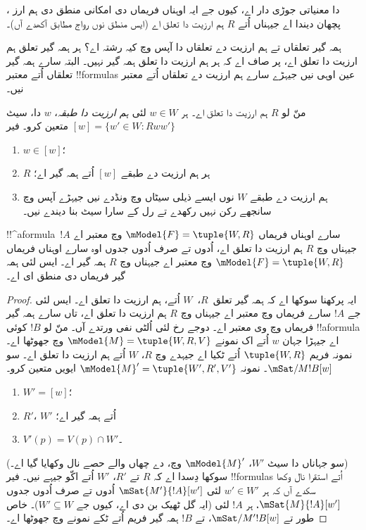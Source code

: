 \documentclass[../../../include/open-logic-section]{subfiles}
\begin{document}
،  دا معنیاتی جوڑی دار اے، کیوں جے ایہ اوہناں فریماں دی امکانی منطق دی ہم ارز پچھان دیندا اے جیہناں اُتے $R$ ہم ارزیت دا تعلق اے (ایس منطق نوں رواج مطابق  آکھدے آں)۔

ہمہ گیر تعلقاں تے ہم ارزیت دے تعلقاں دا آپس وچ کیہ رشتہ اے؟ ہر ہمہ گیر تعلق ہم ارزیت دا تعلق اے، پر صاف اے کہ ہر ہم ارزیت دا تعلق ہمہ گیر نہیں۔ البتہ سارے ہمہ گیر تعلقاں اُتے معتبر !!{formula}s عین اوہی نیں جیہڑے سارے ہم ارزیت دے تعلقاں اُتے معتبر نیں۔

\begin{prop}
  منّ لو $R$ ہم ارزیت دا تعلق اے۔ ہر $w \in W$ لئی \emph{ہم ارزیت دا طبقہ}، $w$ دا، سیٹ $[w] = \{w'\in W :
  Rww'\}$ متعین کرو۔ فیر
  \begin{enumerate}
  \item $w \in [w]$؛
  \item $R$ ہر ہم ارزیت دے طبقے $[w]$ اُتے ہمہ گیر اے؛
  \item ہم ارزیت دے طبقے $W$ نوں ایسے ذیلی سیٹاں وچ ونڈدے نیں جیہڑے آپس وچ سانجھے رکن نہیں رکھدے تے رل کے سارا سیٹ بنا دیندے نیں۔
  \end{enumerate}
\end{prop}

\begin{prop}
  !!^a{formula}~$!A$ سارے اوہناں فریماں $\mModel{F} =\tuple{W,R}$ وچ معتبر اے جیہناں وچ $R$ ہم ارزیت دا تعلق اے، اُدوں تے صرف اُدوں جدوں اوہ سارے اوہناں فریماں $\mModel{F} =\tuple{W,R}$ وچ معتبر اے جیہناں وچ $R$ ہمہ گیر اے۔ ایس لئی ہمہ گیر فریماں دی منطق  ای اے۔
\end{prop}

\begin{proof}
  ایہ پرکھنا سوکھا اے کہ ہمہ گیر تعلق~$R$،~$W$ اُتے، ہم ارزیت دا تعلق اے۔ ایس لئی جے $!A$ سارے فریماں وچ معتبر اے جیہناں وچ $R$ ہم ارزیت دا تعلق اے، تاں سارے ہمہ گیر فریماں وچ وی معتبر اے۔ دوجے رخ لئی اُلٹی نفی ورتدے آں۔ منّ لو $!B$ کوئی !!a{formula} اے جیہڑا جہان $w$ اُتے اک نمونے $\mModel{M} = \tuple{W, R, V}$ وچ جھوٹھا اے۔ نمونہ فریم $\tuple{W,R}$ اُتے ٹکیا اے جیہدے وچ $R$، $W$ اُتے ہم ارزیت دا تعلق اے۔ سو $\mSat/{M}{!B}[w]$۔ نمونہ $\mModel{M}' = \tuple{W',
    R', V'}$ ایویں متعین کرو۔
  \begin{enumerate}
  \item $W' = [w]$؛
  \item $R'$، $W'$ اُتے ہمہ گیر اے؛
  \item $V'(p) = V(p) \cap W'$۔
  \end{enumerate}
  (سو جہاناں دا سیٹ $W'$، $\mModel{M}'$ وچ،  دے چھاں والے حصے نال وکھایا گیا اے۔) سوکھا دِسدا اے کہ $R$ تے $R'$، $W'$ اُتے اکّو جیہے نیں۔ فیر !!{formula}s اُتے استقرا نال وکھا سکدے آں کہ ہر $w' \in W'$ لئی $\mSat{M'}{!A}[w']$ اُدوں تے صرف اُدوں جدوں $\mSat{M}{!A}[w']$، ہر $!A$ لئی (ایہ گل ٹھیک بن دی اے، کیوں جے $W'
  \subseteq W$)۔ خاص طور تے $\mSat/{M'}{!B}[w]$، تے $!B$ ہمہ گیر فریم اُتے ٹکے نمونے وچ جھوٹھا اے۔
\end{proof}
\end{document}
